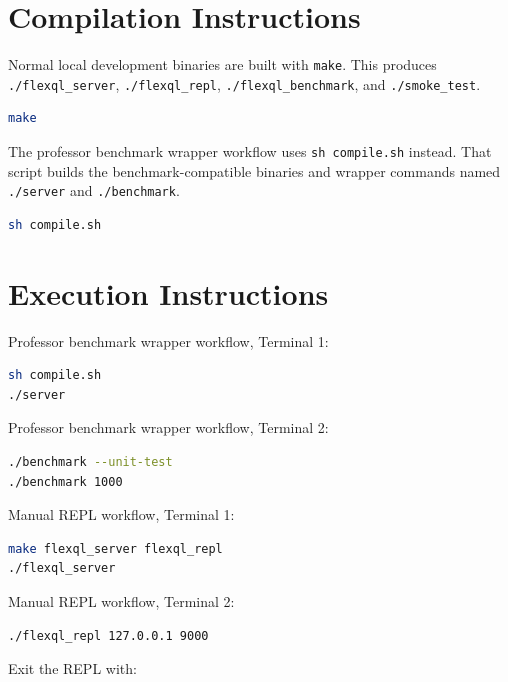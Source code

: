 \documentclass[11pt,a4paper]{article}
\begin{document}
\section{Compilation Instructions}

Normal local development binaries are built with \texttt{make}. This produces \texttt{./flexql\_server}, \texttt{./flexql\_repl}, \texttt{./flexql\_benchmark}, and \texttt{./smoke\_test}.

\begin{lstlisting}[style=commandstyle,language=bash]
make
\end{lstlisting}

The professor benchmark wrapper workflow uses \texttt{sh compile.sh} instead. That script builds the benchmark-compatible binaries and wrapper commands named \texttt{./server} and \texttt{./benchmark}.

\begin{lstlisting}[style=commandstyle,language=bash]
sh compile.sh
\end{lstlisting}

\section{Execution Instructions}

Professor benchmark wrapper workflow, Terminal 1:

\begin{lstlisting}[style=commandstyle,language=bash]
sh compile.sh
./server
\end{lstlisting}

Professor benchmark wrapper workflow, Terminal 2:

\begin{lstlisting}[style=commandstyle,language=bash]
./benchmark --unit-test
./benchmark 1000
\end{lstlisting}

Manual REPL workflow, Terminal 1:

\begin{lstlisting}[style=commandstyle,language=bash]
make flexql_server flexql_repl
./flexql_server
\end{lstlisting}

Manual REPL workflow, Terminal 2:

\begin{lstlisting}[style=commandstyle,language=bash]
./flexql_repl 127.0.0.1 9000
\end{lstlisting}

Exit the REPL with:
\end{document}

